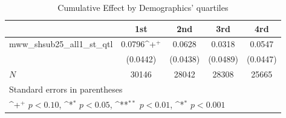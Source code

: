 \begin{table}[htbp]\centering
\def\sym#1{\ifmmode^{#1}\else\(^{#1}\)\fi}
\caption{Cumulative Effect by Demographics' quartiles}
\begin{tabular}{l*{4}{c}}
\hline\hline
            &\multicolumn{1}{c}{1st}&\multicolumn{1}{c}{2nd}&\multicolumn{1}{c}{3rd}&\multicolumn{1}{c}{4rd}\\
\hline
mww\_shsub25\_all1\_st\_qtl&      0.0796\sym{+}&      0.0628       &      0.0318       &      0.0547       \\
            &    (0.0442)       &    (0.0438)       &    (0.0489)       &    (0.0447)       \\
\hline
\(N\)       &       30146       &       28042       &       28308       &       25665       \\
\hline\hline
\multicolumn{5}{l}{\footnotesize Standard errors in parentheses}\\
\multicolumn{5}{l}{\footnotesize \sym{+} \(p<0.10\), \sym{*} \(p<0.05\), \sym{**} \(p<0.01\), \sym{*} \(p<0.001\)}\\
\end{tabular}
\end{table}
